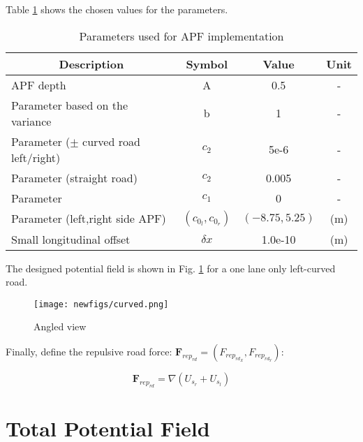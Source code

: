 \documentclass[letterpaper, 10 pt, conference]{ieeeconf}  %
\begin{document}
Table \ref{table:apf} shows the chosen values for the parameters.

\begin{table}[]
\centering
\caption{Parameters used for APF implementation}
\label{table:apf}
\begin{tabular}{@{}lccc@{}}
\toprule
\multicolumn{1}{c}{\textbf{Description}} & \textbf{Symbol} & \textbf{Value} & \textbf{Unit} \\ \midrule
APF depth                                & A               & 0.5            &   -            \\
Parameter based on the variance          & b               & 1              &  -             \\
Parameter ($\pm$ curved road left/right)             & $c_2$           & 5e-6           &  -             \\
Parameter (straight road)                & $c_2$           & 0.005          & -              \\
Parameter                                & $c_1$           & 0              &  -             \\
Parameter (left,right side APF)               & $(c_{0_l},c_{0_r})$       & $(-8.75, 5.25)$          & (m)           \\
Small longitudinal offset                & $\delta x$      & 1.0e-10        & (m)           \\ \bottomrule
\end{tabular}
\end{table}

The designed potential field is shown in Fig. \ref{fig:curved} for a one lane only left-curved road.

\begin{figure}[h!]
\centering
    \texttt{[image: newfigs/curved.png]}
    \caption{Angled view}
    \label{fig:curved}
  \end{figure}

Finally, define the repulsive road force: $\textbf{F}_{rep_{rd}}=(F_{rep_{rd_X}},F_{rep_{rd_Y}})$:

\begin{equation}
    \textbf{F}_{rep_{rd}} = \nabla (U_{s_r} + U_{s_l})
\end{equation}

\section{Total Potential Field} \label{sec:tpf}
\end{document}
